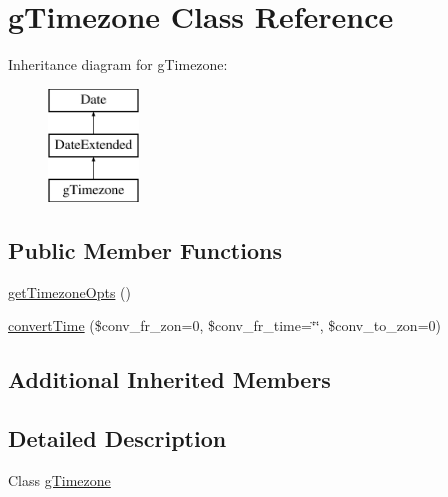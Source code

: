 \hypertarget{classg_timezone}{\section{g\-Timezone Class Reference}
\label{classg_timezone}
}
Inheritance diagram for g\-Timezone\-:\begin{figure}[H]
\begin{center}
\leavevmode
\includegraphics[height=3.000000cm]{classg_timezone}
\end{center}
\end{figure}
\subsection*{Public Member Functions}
\begin{DoxyCompactItemize}
\item 
\hyperlink{classg_timezone_a877ccfb1a58d9c47f2d53ea6e87fa135}{get\-Timezone\-Opts} ()
\item 
\hyperlink{classg_timezone_a587655a6cdfbd5d48afd726336fc69e3}{convert\-Time} (\$conv\-\_\-fr\-\_\-zon=0, \$conv\-\_\-fr\-\_\-time=\char`\"{}\char`\"{}, \$conv\-\_\-to\-\_\-zon=0)
\end{DoxyCompactItemize}
\subsection*{Additional Inherited Members}


\subsection{Detailed Description}
Class \hyperlink{classg_timezone}{g\-Timezone} 

